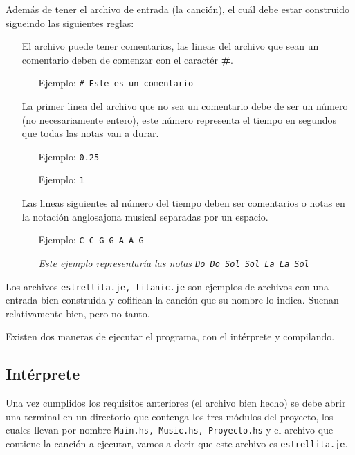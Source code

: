 \documentclass[10pt,a4paper]{article}
\begin{document}
Además de tener el archivo de entrada (la canción), el cuál debe estar construido
sigueindo las siguientes reglas:
\begin{itemize}
\item[\textbullet] El archivo puede tener comentarios, las lineas del archivo que
  sean un comentario deben de comenzar con el caractér \textbf{\#}.
  \begin{itemize}
  \item [Ejemplo:] \texttt{\# Este es un comentario}
  \end{itemize}
\item[\textbullet] La primer linea del archivo que no sea un comentario debe de
  ser un número (no necesariamente entero), este número  representa el tiempo en
  segundos que todas las notas van a durar.
  \begin{itemize}
  \item [Ejemplo:] \texttt{0.25}
  \item [Ejemplo:] \texttt{1}
  \end{itemize}
\item[\textbullet] Las lineas siguientes al número del tiempo deben ser
  comentarios o notas en la notación anglosajona musical separadas por un espacio.
  \begin{itemize}
  \item [Ejemplo:] \texttt{C C G G A A G}
    
    \textit{Este ejemplo representaría las notas
      \texttt{Do Do Sol Sol La La Sol}}
  \end{itemize}
\end{itemize}

Los archivos \texttt{estrellita.je, titanic.je} son ejemplos de archivos con una
entrada bien construida y cofifican la canción que su nombre lo indica. Suenan
relativamente bien, pero no tanto.

Existen dos maneras de ejecutar el programa, con el intérprete y compilando.

\subsection{Intérprete}
Una vez cumplidos los requisitos anteriores (el archivo bien hecho) se debe abrir
una terminal en un directorio que contenga los tres módulos del proyecto, los
cuales llevan por nombre \texttt{Main.hs, Music.hs, Proyecto.hs} y el archivo que
contiene la canción a ejecutar, vamos a decir que este archivo es
\texttt{estrellita.je}.
\end{document}
